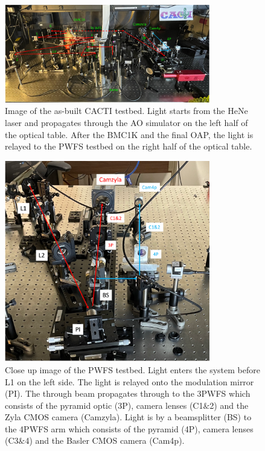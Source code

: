 \begin{figure}
    \centering
    \includegraphics[width=0.8\textwidth]{Chapter Materials/Chapter Five Materials/cactiTestbed.png}
    \caption{Image of the as-built CACTI testbed. Light starts from the HeNe laser and propagates through the AO simulator on the left half of the optical table. After the BMC1K and the final OAP, the light is relayed to the PWFS testbed on the right half of the optical table.}
    \label{fig:cactiTestbed}
\end{figure}

\begin{figure}
    \centering
    \includegraphics[width=0.8\textwidth]{Chapter Materials/Chapter Five Materials/PWFStestbed.png}
    \caption{Close up image of the PWFS testbed. Light enters the system before L1 on the left side. The light is relayed onto the modulation mirror (PI). The through beam propagates through to the 3PWFS which consists of the pyramid optic (3P), camera lenses (C1$\&$2) and the Zyla CMOS camera (Camzyla). Light is by a beamsplitter (BS) to the 4PWFS arm which consists of the pyramid (4P), camera lenses (C3$\&$4) and the Basler CMOS camera (Cam4p).  }
    \label{fig:PWFStestbed}
\end{figure}


